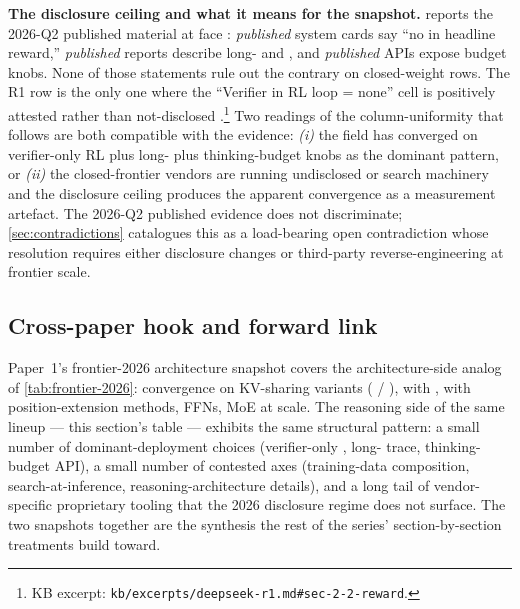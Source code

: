 \begin{contradiction}
\textbf{The disclosure ceiling and what it means for the snapshot.}
 reports the 2026-Q2 published material at
face : \emph{published} system cards say ``no  in headline
reward,'' \emph{published} reports describe long- and , and
\emph{published} APIs expose budget knobs. None of those statements
rule out the contrary on closed-weight rows. The R1 row is the only
one where the ``Verifier in RL loop = none'' cell is positively
attested rather than not-disclosed
\citep[\S 2.2]{deepseek-r1}.\footnote{KB excerpt:
\texttt{kb/excerpts/deepseek-r1.md\#sec-2-2-reward}.} Two readings of
the column-uniformity that follows are both compatible with the
evidence: \emph{(i)} the field has converged on verifier-only RL plus
long- plus thinking-budget knobs as the dominant pattern, or
\emph{(ii)} the closed-frontier vendors are running undisclosed 
or search machinery and the disclosure ceiling produces the apparent
convergence as a measurement artefact. The 2026-Q2 published evidence
does not discriminate; \cref{sec:contradictions} catalogues this as a
load-bearing open contradiction whose resolution requires either
disclosure changes or third-party reverse-engineering at frontier
scale.
\end{contradiction}

\subsection{Cross-paper hook and forward link}
\label{sec:frontier-forward}

Paper~1's frontier-2026 architecture snapshot covers the
architecture-side analog of \cref{tab:frontier-2026}: convergence on
KV-sharing variants ( / ),  with ,  with
position-extension methods,  FFNs, MoE at scale. The reasoning
side of the same lineup --- this section's table --- exhibits the same
structural pattern: a small number of dominant-deployment choices
(verifier-only , long- trace, thinking-budget API), a small
number of contested axes (training-data composition, search-at-inference,
reasoning-architecture details), and a long tail of vendor-specific
proprietary tooling that the 2026 disclosure regime does not surface.
The two snapshots together are the synthesis the rest of the series'
section-by-section treatments build toward.

